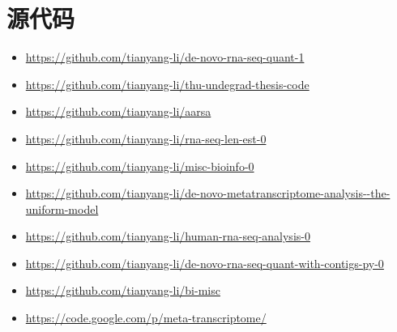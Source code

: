 
\chapter{源代码}
\begin{itemize}
\item \url{https://github.com/tianyang-li/de-novo-rna-seq-quant-1}
\item \url{https://github.com/tianyang-li/thu-undegrad-thesis-code}
\item \url{https://github.com/tianyang-li/aarsa}
\item \url{https://github.com/tianyang-li/rna-seq-len-est-0}
\item \url{https://github.com/tianyang-li/misc-bioinfo-0}
\item \url{https://github.com/tianyang-li/de-novo-metatranscriptome-analysis--the-uniform-model}
\item \url{https://github.com/tianyang-li/human-rna-seq-analysis-0}
\item \url{https://github.com/tianyang-li/de-novo-rna-seq-quant-with-contigs-py-0}
\item \url{https://github.com/tianyang-li/bi-misc}
\item \url{https://code.google.com/p/meta-transcriptome/}
\end{itemize}

